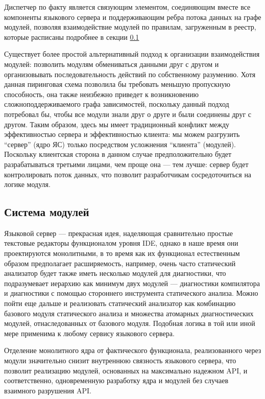 Диспетчер по факту является связующим элементом, соединяющим вместе все компоненты языкового сервера и поддерживающим ребра потока данных на графе модулей, позволяя взаимодействие модулей по правилам, загруженным в реестр, которые расписаны подробнее в секции \ref{sec:met:arch:ms}

Существует более простой альтернативный подход к организации взаимодействия модулей: позволить модулям обмениваться данными друг с другом и организовывать последовательность действий по собственному разумению. Хотя данная пиринговая схема позволила бы требовать меньшую пропускную способность, она также неизбежно приведет к возникновению сложноподдерживаемого графа зависимостей, поскольку данный подход потребовал бы, чтобы все модули знали друг о друге и были соединены друг с другом. Таким образом, здесь мы имеет традиционный конфликт между эффективностью сервера и эффективностью клиента: мы можем разгрузить ``сервер'' (ядро ЯС) только посредством усложнения ``клиента'' (модулей). Поскольку клиентская сторона в данном случае предположительно будет разрабатываться третьими лицами, чем проще она --- тем лучше: сервер будет контролировать поток данных, что позволит разработчикам сосредоточиться на логике модуля.

\subsection{Система модулей}
\label{sec:met:arch:ms}

Языковой сервер --- прекрасная идея, наделяющая сравнительно простые текстовые редакторы функционалом уровня IDE, однако в наше время они проектируются монолитными, в то время как их функционал естественным образом предполагает расширяемость, например, очень часто статический анализатор будет также иметь несколько модулей для диагностики, что подразумевает иерархию как минимум двух модулей --- диагностики компилятора и диагностики с помощью стороннего инструмента статического анализа. Можно пойти еще дальше и реализовать статический анализатор как комбинацию базового модуля статического анализа и множества атомарных диагностических модулей, отнаследованных от базового модуля. Подобная логика в той или иной мере применима к любому сервису языкового сервера.

Отделение монолитного ядра от фактического функционала, реализованного через модули значительно снизит внутреннюю связность языкового сервера, что позволит реализацию модулей, основанных на максимально надежном API, и соответственно, одновременную разработку ядра и модулей без случаев взаимного разрушения API.

